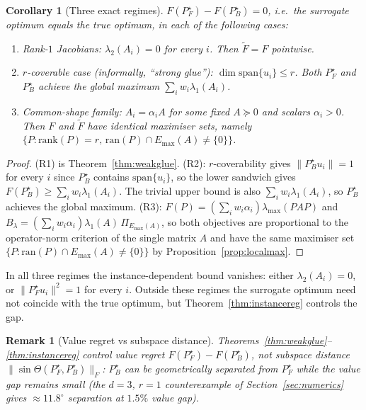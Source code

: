 \documentclass[final,3p,times]{elsarticle}
\newtheorem{corollary}[theorem]{Corollary}
\newtheorem{remark}[theorem]{Remark}
\newcommand{\rank}{\mathrm{rank}}
\newcommand{\ran}{\mathrm{ran}}
\newcommand{\Emax}{E_{\max}}
\begin{document}
\begin{corollary}[Three exact regimes]\label{cor:equality}
$F(P_F^\star)-F(P_B^\star)=0$, i.e.\ the surrogate optimum equals the
true optimum, in each of the following cases:
\begin{enumerate}
\item[(R1)] \emph{Rank-$1$ Jacobians:} $\lambda_2(A_i)=0$ for every $i$.
Then $\tilde F=F$ pointwise.
\item[(R2)] \emph{$r$-coverable case (informally, ``strong glue''):}
$\dim\mathrm{span}\{u_i\}\le r$.
Both $P_F^\star$ and $P_B^\star$ achieve the global maximum
$\sum_i w_i\lambda_1(A_i)$.
\item[(R3)] \emph{Common-shape family:} $A_i=\alpha_i A$ for some fixed
$A\succeq 0$ and scalars $\alpha_i>0$.
Then $F$ and $\tilde F$ have identical maximiser sets, namely
$\{P:\rank(P)=r,\,\ran(P)\cap\Emax(A)\ne\{0\}\}$.
\end{enumerate}
\end{corollary}

\begin{proof}
(R1) is Theorem~\ref{thm:weakglue}.
(R2): $r$-coverability gives $\|P_B^\star u_i\|=1$ for every $i$ since
$P_B^\star$ contains $\mathrm{span}\{u_i\}$, so the lower sandwich gives
$F(P_B^\star)\ge\sum_i w_i\lambda_1(A_i)$.
The trivial upper bound is also $\sum_i w_i\lambda_1(A_i)$, so $P_B^\star$
achieves the global maximum.
(R3): $F(P)=(\sum_i w_i\alpha_i)\lambda_{\max}(PAP)$ and $B_\lambda
=(\sum_i w_i\alpha_i)\lambda_1(A)\,\Pi_{\Emax(A)}$, so both objectives are
proportional to the operator-norm criterion of the single matrix $A$
and have the same maximiser set
$\{P:\ran(P)\cap\Emax(A)\ne\{0\}\}$ by Proposition~\ref{prop:localmax}.
\end{proof}

In all three regimes the instance-dependent bound vanishes: either
$\lambda_2(A_i)=0$, or $\|P_F^\star u_i\|^2=1$ for every $i$.
Outside these regimes the surrogate optimum need not coincide with the
true optimum, but Theorem~\ref{thm:instancereg} controls the gap.

\begin{remark}[Value regret vs subspace distance]
\label{rem:valuevssubspace}
Theorems~\ref{thm:weakglue}--\ref{thm:instancereg} control \emph{value
regret} $F(P_F^\star)-F(P_B^\star)$, not subspace distance
$\|\sin\Theta(P_F^\star,P_B^\star)\|_F$: $P_B^\star$ can be
geometrically separated from $P_F^\star$ while the value gap remains
small (the $d=3$, $r=1$ counterexample of Section~\ref{sec:numerics}
gives $\approx 11.8^\circ$ separation at $1.5\%$ value gap).
\end{remark}
\end{document}
